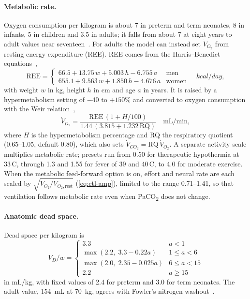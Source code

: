 \paragraph{Metabolic rate.} Oxygen consumption per kilogram is about 7 in preterm and term neonates, 8 in infants, 5 in children and 3.5 in adults; it falls from about 7 at eight years to adult values near seventeen~\citep{schofield1985,harrell2005}. For adults the model can instead set $\dot V_{O_2}$ from resting energy expenditure (REE). REE comes from the Harris--Benedict equations~\citep{harris1918},
\begin{equation}
\mathrm{REE}=\begin{cases}66.5+13.75\,w+5.003\,h-6.755\,a & \text{men}\\ 655.1+9.563\,w+1.850\,h-4.676\,a & \text{women}\end{cases}\quad\si{kcal/day},
\label{eq:par-ree}
\end{equation}
with weight $w$ in kg, height $h$ in cm and age $a$ in years. It is raised by a hypermetabolism setting of $-40$ to $+150\%$ and converted to oxygen consumption with the Weir relation~\citep{weir1949},
\begin{equation}
\dot V_{O_2}=\frac{\mathrm{REE}\,(1+H/100)}{1.44\,(3.815+1.232\,\mathrm{RQ})}\quad\si{\milli\liter\per\minute},
\label{eq:par-weir}
\end{equation}
where $H$ is the hypermetabolism percentage and RQ the respiratory quotient (0.65--1.05, default 0.80), which also sets $\dot V_{CO_2}=\mathrm{RQ}\,\dot V_{O_2}$. A separate activity scale multiplies metabolic rate; presets run from 0.50 for therapeutic hypothermia at 33\,\textdegree{}C, through 1.3 and 1.55 for fever of 39 and 40\,\textdegree{}C, to 4.0 for moderate exercise. When the metabolic feed-forward option is on, effort and neural rate are each scaled by $\sqrt{\dot V_{O_2}/\dot V_{O_2,\mathrm{rest}}}$ (\cref{eq:ctl-amp}), limited to the range 0.71--1.41, so that ventilation follows metabolic rate even when PaCO\textsubscript{2} does not change.

\paragraph{Anatomic dead space.} Dead space per kilogram is
\begin{equation}
V_D/w=\begin{cases}3.3 & a<1\\ \max(2.2,\;3.3-0.22a) & 1\le a<6\\ \max(2.0,\;2.35-0.025a) & 6\le a<15\\ 2.2 & a\ge15\end{cases}
\label{eq:par-vd}
\end{equation}
in mL/kg, with fixed values of 2.4 for preterm and 3.0 for term neonates. The adult value, \SI{154}{\milli\liter} at \SI{70}{\kilo\gram}, agrees with Fowler's nitrogen washout~\citep{fowler1948}.

